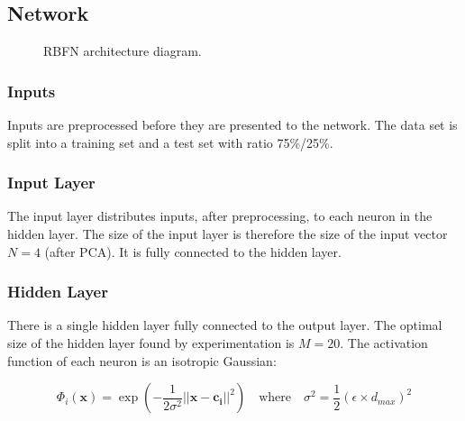 \documentclass[a4paper, 11pt]{article}
\begin{document}
\subsection*{Network}
\begin{figure}[h]
\centering
  \caption{RBFN architecture diagram.}
  \label{fig:architecture}
\end{figure}

\subsubsection*{Inputs}
Inputs are preprocessed before they are presented to the network. The data set is split into a training set and a test set with ratio 75\%/25\%.

\subsubsection*{Input Layer}
The input layer distributes inputs, after preprocessing, to each neuron in the hidden layer. The size of the input layer is therefore the size of the input vector $N=4$ (after PCA). It is fully connected to the hidden layer.

\subsubsection*{Hidden Layer}
There is a single hidden layer fully connected to the output layer. The optimal size of the hidden layer found by experimentation is $M=20$. The activation function of each neuron is an isotropic Gaussian:

\begin{equation}
\Phi_i(\boldsymbol{x}) = \exp\left(-\frac{1}{2\sigma^2} \lvert\lvert \boldsymbol{x} -  \boldsymbol{c_i} \rvert\rvert ^2\right)
\quad \mathrm{where }\quad
\sigma^2 = \frac{1}{2}(\epsilon \times d_{max})^2
\label{eq:rbf}
\end{equation}
\end{document}
